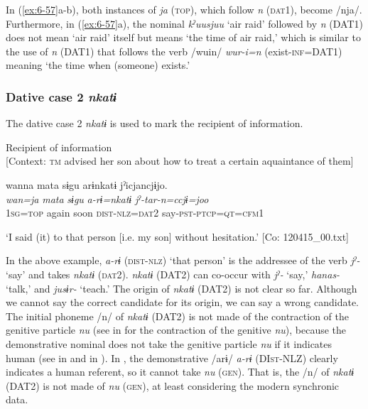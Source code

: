 \begin{table}
In (\ref{ex:6-57}a-b), both instances of \textit{ja} (\textsc{top}), which follow \textit{n} (\textsc{dat}1), become /nja/. Furthermore, in (\ref{ex:6-57}a), the nominal \textit{kˀuusjuu} ‘air raid’ followed by \textit{n} (DAT1) does not mean ‘air raid’ itself but means ‘the time of air raid,’ which is similar to the use of \textit{n} (DAT1) that follows the verb /wuin/ \textit{wur-i=n} (exist-\textsc{inf}=DAT1) meaning ‘the time when (someone) exists.’

\subsubsection{Dative case 2 \textit{nkatɨ}}

The dative case 2 \textit{nkatɨ} is used to mark the recipient of information.

\ea\label{ex:6-58}
 Recipient of information\\{}
[Context: \textsc{tm} advised her son about how to treat a certain aquaintance of them]

{\TM}
\glll wanna  mata  sɨgu  arɨnkatɨ  jˀicjancjɨjo.\\
\textit{wan=ja}  \textit{mata}  \textit{sɨgu}  \textit{a-rɨ=nkatɨ}  \textit{jˀ-tar-n=ccjɨ=joo}\\

    1\textsc{sg}=\textsc{top}  again  soon  \textsc{dist}-\textsc{nlz}=\textsc{dat}2  say-\textsc{pst}-\textsc{ptcp}=\textsc{qt}=\textsc{cfm}1

\glt    ‘I said (it) to that person [i.e. my son] without hesitation.’ [Co: 120415\_00.txt]
\z

In the above example, \textit{a-rɨ} (\textsc{dist}-\textsc{nlz}) ‘that person’ is the addressee of the verb \textit{jˀ-} ‘say’ and takes \textit{nkatɨ} (\textsc{dat}2). \textit{nkatɨ} (DAT2) can co-occur with \textit{jˀ-} ‘say,’ \textit{hanas-} ‘talk,’ and \textit{jusɨr-} ‘teach.’ The origin of \textit{nkatɨ} (DAT2) is not clear so far. Although we cannot say the correct candidate for its origin, we can say a wrong candidate. The initial phoneme /n/ of \textit{nkatɨ} (DAT2) is not made of the contraction of the genitive particle \textit{nu} (see  in  for the contraction of the genitive \textit{nu}), because the demonstrative nominal does not take the genitive particle \textit{nu} if it indicates human (see  in  and  in ). In , the demonstrative /arɨ/ \textit{a-rɨ} (DI\textsc{st}-NLZ) clearly indicates a human referent, so it cannot take \textit{nu} (\textsc{gen}). That is, the /n/ of \textit{nkatɨ} (DAT2) is not made of \textit{nu} (\textsc{gen}), at least considering the modern synchronic data.


\end{table}
